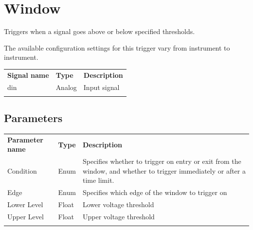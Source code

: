 \section{Window}

Triggers when a signal goes above or below specified thresholds.

The available configuration settings for this trigger vary from instrument to instrument.

\begin{tabularx}{16cm}{llX}
\thickhline
\textbf{Signal name} & \textbf{Type} & \textbf{Description} \\
\thickhline
din & Analog & Input signal \\
\thickhline
\end{tabularx}

\subsection{Parameters}

\begin{tabularx}{16cm}{llX}
\thickhline
\textbf{Parameter name} & \textbf{Type} & \textbf{Description} \\
\thickhline
Condition & Enum & Specifies whether to trigger on entry or exit from the window, and whether to trigger immediately or
after a time limit.\\
\thinhline
Edge & Enum & Specifies which edge of the window to trigger on\\
\thinhline
Lower Level & Float & Lower voltage threshold\\
\thinhline
Upper Level & Float & Upper voltage threshold\\
\thickhline
\end{tabularx}

